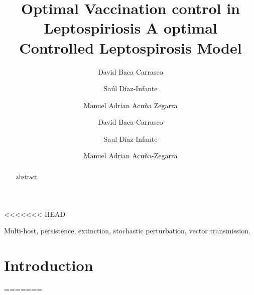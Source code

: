 \documentclass[3p,sort&compress]{elsarticle}
\DeclareRobustCommand{\1}[1]{\ensuremath \mathbbm{1}_{\{#1\}}}
\begin{document}
    \begin{frontmatter}
        \title{
            Optimal Vaccination control in Leptospiriosis
        }
        \author[add:unison]{%
            David Baca Carrasco
        }%
        \author[add:conacyt_unison]{%
            Sa\'ul D\'iaz-Infante
        }%
        \author[add:unison]%
        {Manuel Adrian Acu\~na Zegarra }
               \address[add:itson]{
         ITSON's address
        }

<<<<<<< HEAD
        \address[add:unison]{
            Departamento de Matem\'aticas, 
            Universidad de Sonora,
            83000, Hermosillo, Mexico
        }
        \address[add:conacyt_unison]{
            CONACYT-Univesrsidad de sonora
            Departamento de Matem\'aticas, 
            Divisi\'on de Posgrado
            Universidad de Sonora,
            83000, Hermosillo, Mexico
        }

        \begin{abstract}
            abstract
        \end{abstract}
        \begin{keyword}
            Multi-host, persistence, extinction, stochastic perturbation,
            vector transmission.
        \end{keyword}
    \end{frontmatter}
    \linenumbers
    \section{Introduction}
=======
\newcommand{\R}{\mathbb{R}}
\newcommand{\N}{\mathbb{N}}
\newcommand{\s}{\subseteq}
\newcommand{\e}{\varepsilon}
%
%
%
\makeatletter
\renewcommand{\Function}[2]{%
  \csname ALG@cmd@\ALG@L @Function\endcsname{#1}{#2}%
  \def\jayden@currentfunction{#1}%
}
\newcommand{\funclabel}[1]{%
  \@bsphack
  \protected@write\@auxout{}{%
    \string\newlabel{#1}{{\jayden@currentfunction}{\thepage}}%
  }%
  \@esphack
}
\makeatother
\title[%
	A optimal Controlled Leptospirosis Model%
	]{
	A optimal Controlled Leptospirosis Model
}
%
%
 
\author[D. Baca]{David Baca-Carrasco}
\author[S. D\'iaz-Infante]{Saul D\'iaz-Infante}
\author[M.A. Acu\~{n}a]{Manuel Adrian Acu\~{n}a-Zegarra}
%
\address[D. Baca-Carrasco]{
  Departamento de Matem\'aticas, 
  Instituto Tecnológico de Sonora,
  Cd. Obregón, Sonora.
}
\address[S. D\'iaz-Infante]{
  Departamento de Matem\'aticas, 
  CONACYT-Universidad de Sonora,
  Hermosillo, Sonora.
}
\end{document}
